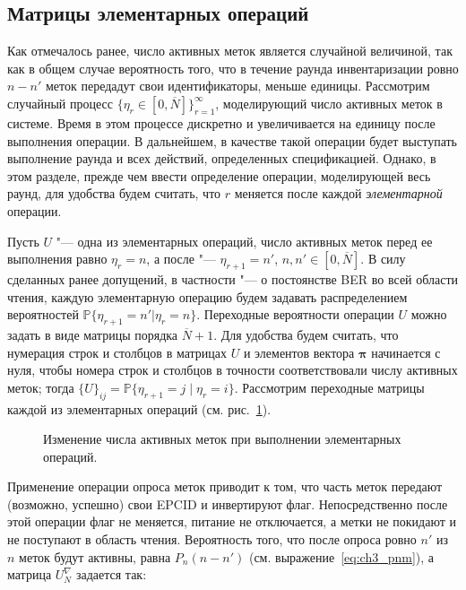 \subsection{Матрицы элементарных операций}\label{subsec:ch3_bg_elem_op_matrices}
Как отмечалось ранее, число активных меток является случайной величиной, так как в общем случае вероятность того, что в течение раунда инвентаризации ровно $n - n'$ меток передадут свои идентификаторы, меньше единицы. Рассмотрим случайный процесс $\{ \eta_r \in [0, \overline{N}] \}_{r=1}^\infty$, моделирующий число активных меток в системе. Время в этом процессе дискретно и увеличивается на единицу после выполнения операции. В дальнейшем, в качестве такой операции будет выступать выполнение раунда и всех действий, определенных спецификацией. Однако, в этом разделе, прежде чем ввести определение операции, моделирующей весь раунд, для удобства будем считать, что $r$ меняется после каждой \textit{элементарной} операции.

Пусть $U$ "--- одна из элементарных операций, число активных меток перед ее выполнения равно $\eta_r = n$, а после "--- $\eta_{r+1} = n'$, $n,n' \in [0,\overline{N}]$. В силу сделанных ранее допущений, в частности "--- о постоянстве BER во всей области чтения, каждую элементарную операцию будем задавать распределением вероятностей $\mathbb{P}\{\eta_{r+1} = n' | \eta_r = n\}$. Переходные вероятности операции $U$ можно задать в виде матрицы порядка $\overline{N} + 1$. Для удобства будем считать, что нумерация строк и столбцов в матрицах $U$ и элементов вектора $\bm{\pi}$ начинается с нуля, чтобы номера строк и столбцов в точности соответствовали числу активных меток; тогда $\{ U \}_{ij} = \mathbb{P}\{ \eta_{r+1} = j\; |\; \eta_{r} = i \}$. Рассмотрим переходные матрицы каждой из элементарных операций (см. рис.~\ref{fig:ch3_bg_trans}).

\begin{figure}[htb]
  \caption{Изменение числа активных меток при выполнении элементарных операций.}
  \label{fig:ch3_bg_trans}
\end{figure}

Применение операции опроса меток приводит к том, что часть меток передают (возможно, успешно) свои EPCID и инвертируют флаг. Непосредственно после этой операции флаг не меняется, питание не отключается, а метки не покидают и не поступают в область чтения. Вероятность того, что после опроса ровно $n'$ из $n$ меток будут активны, равна $P_n(n - n')$ (см. выражение~\eqref{eq:ch3_pnm}), а матрица $U_N^\nabla$ задается так:

